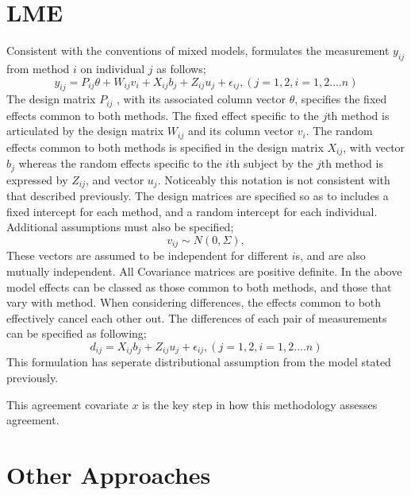 \documentclass[12pt, a4paper]{report}
\theoremstyle{plain}
\theoremstyle{definition}
\theoremstyle{remark}
\begin{document}
\section{LME}
Consistent with the conventions of mixed models, \citet{pkc}
formulates the measurement $y_{ij} $from method $i$ on individual
$j$ as follows;
\begin{equation}
y_{ij} =P_{ij}\theta + W_{ij}v_{i} + X_{ij}b_{j} + Z_{ij}u_{j} +
\epsilon_{ij},     (j=1,2, i=1,2....n)
\end{equation}
The design matrix $P_{ij}$ , with its associated column vector
$\theta$, specifies the fixed effects common to both methods. The
fixed effect specific to the $j$th method is articulated by the
design matrix $W_{ij}$ and its column vector $v_{i}$. The random
effects common to both methods is specified in the design matrix
$X_{ij}$, with vector $b_{j}$ whereas the random effects specific
to the $i$th subject by the $j$th method is expressed by $Z_{ij}$,
and vector $u_{j}$. Noticeably this notation is not consistent
with that described previously.  The design matrices are specified
so as to includes a fixed intercept for each method, and a random
intercept for each individual. Additional assumptions must also be
specified;
\begin{equation}
v_{ij} \sim N(0,\Sigma),
\end{equation}
These vectors are assumed to be independent for different $i$s,
and are also mutually independent. All Covariance matrices are
positive definite.  In the above model effects can be classed as
those common to both methods, and those that vary with method.
When considering differences, the effects common to both
effectively cancel each other out. The differences of each pair of
measurements can be specified as following;
\begin{equation}
d_{ij} = X_{ij}b_{j} + Z_{ij}u_{j} + \epsilon_{ij},     (j=1,2,
i=1,2....n)
\end{equation}
This formulation has seperate distributional assumption from the
model stated previously.

This agreement covariate $x$ is the key step in how this
methodology assesses agreement.


\section{Other Approaches}
\end{document}
